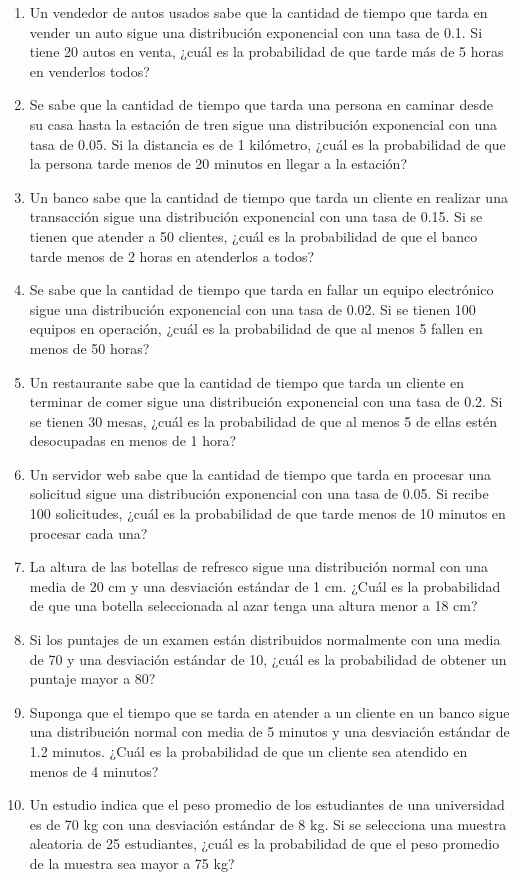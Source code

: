 \begin{Ejer}
\begin{enumerate}
    \item Un vendedor de autos usados sabe que la cantidad de tiempo que tarda en vender un auto sigue una distribución exponencial con una tasa de 0.1. Si tiene 20 autos en venta, ¿cuál es la probabilidad de que tarde más de 5 horas en venderlos todos?
    \item Se sabe que la cantidad de tiempo que tarda una persona en caminar desde su casa hasta la estación de tren sigue una distribución exponencial con una tasa de 0.05. Si la distancia es de 1 kilómetro, ¿cuál es la probabilidad de que la persona tarde menos de 20 minutos en llegar a la estación?
    \item Un banco sabe que la cantidad de tiempo que tarda un cliente en realizar una transacción sigue una distribución exponencial con una tasa de 0.15. Si se tienen que atender a 50 clientes, ¿cuál es la probabilidad de que el banco tarde menos de 2 horas en atenderlos a todos?
    \item Se sabe que la cantidad de tiempo que tarda en fallar un equipo electrónico sigue una distribución exponencial con una tasa de 0.02. Si se tienen 100 equipos en operación, ¿cuál es la probabilidad de que al menos 5 fallen en menos de 50 horas?
    \item Un restaurante sabe que la cantidad de tiempo que tarda un cliente en terminar de comer sigue una distribución exponencial con una tasa de 0.2. Si se tienen 30 mesas, ¿cuál es la probabilidad de que al menos 5 de ellas estén desocupadas en menos de 1 hora?
    \item Un servidor web sabe que la cantidad de tiempo que tarda en procesar una solicitud sigue una distribución exponencial con una tasa de 0.05. Si recibe 100 solicitudes, ¿cuál es la probabilidad de que tarde menos de 10 minutos en procesar cada una?
    
    \item La altura de las botellas de refresco sigue una distribución normal con una media de 20 cm y una desviación estándar de 1 cm. ¿Cuál es la probabilidad de que una botella seleccionada al azar tenga una altura menor a 18 cm?
    \item Si los puntajes de un examen están distribuidos normalmente con una media de 70 y una desviación estándar de 10, ¿cuál es la probabilidad de obtener un puntaje mayor a 80?
    \item Suponga que el tiempo que se tarda en atender a un cliente en un banco sigue una distribución normal con media de 5 minutos y una desviación estándar de 1.2 minutos. ¿Cuál es la probabilidad de que un cliente sea atendido en menos de 4 minutos?
    \item Un estudio indica que el peso promedio de los estudiantes de una universidad es de 70 kg con una desviación estándar de 8 kg. Si se selecciona una muestra aleatoria de 25 estudiantes, ¿cuál es la probabilidad de que el peso promedio de la muestra sea mayor a 75 kg?

\end{enumerate}
\end{Ejer} 


